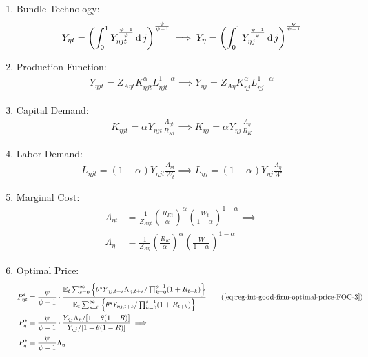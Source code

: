 \documentclass[../thesis.tex]{subfiles}
\begin{document}
\begin{enumerate}
	\item Bundle Technology:
	\begin{align}
		Y_{\eta t} = \left( \int_{0}^{1} Y_{\eta jt}^{\frac{\psi-1}{\psi}} \dif j \right)^{\frac{\psi}{\psi-1}} \implies %
		Y_{\eta} = \left( \int_{0}^{1} Y_{\eta j}^{\frac{\psi-1}{\psi}} \dif j \right)^{\frac{\psi}{\psi-1}} \label{eq:reg-ss-final-goods-firm-bundle-rule}
	\end{align}
	
	\item Production Function:
	\begin{align}
		Y_{\eta jt} = Z_{A\eta t} K_{\eta jt}^{\alpha_{}} L_{\eta jt}^{1-{\alpha_{}}} \implies Y_{\eta j} = Z_{A\eta} K_{\eta j}^{\alpha_{}} L_{\eta j}^{1-{\alpha_{}}} \label{eq:reg-ss-int-good-firm-production-function}
	\end{align}
	
	\item Capital Demand:
	\begin{align}
		K_{\eta jt} = {\alpha_{}} Y_{\eta jt} \frac{\Lambda_{\eta t}}{R_{Kt}} \implies K_{\eta j} = {\alpha_{}} Y_{\eta j} \frac{\Lambda_{\eta}}{R_K} \label{eq:reg-ss-int-good-firm-FOC-Kt}
	\end{align}
	
	\item Labor Demand:
	\begin{align}
		L_{\eta jt} = (1-{\alpha_{}}) Y_{\eta jt} \frac{\Lambda_{\eta t}}{W_t} \implies L_{\eta j} = (1 -{\alpha_{}}) Y_{\eta j} \frac{\Lambda_{\eta}}{W} \label{eq:reg-ss-int-good-firm-FOC-Lt}
	\end{align}
	
	\item Marginal Cost:
	\begin{align}
		\Lambda_{\eta t} &= \frac{1}{Z_{A\eta t}} \left( \frac{R_{Kt}}{{\alpha_{}}} \right)^{{\alpha_{}}} \left( \frac{W_t}{1-{\alpha_{}}} \right)^{1-{\alpha_{}}} \implies \nonumber \\
		\Lambda_{\eta} &= \frac{1}{Z_{A\eta}} \left( \frac{R_K}{{\alpha_{}}} \right)^{{\alpha_{}}} \left( \frac{W}{1-{\alpha_{}}} \right)^{1-{\alpha_{}}} \label{eq:reg-ss-int-good-firm-MC-2}
	\end{align}
	
	\item Optimal Price:
	\begin{alignat}{2}
		P_{\eta t}^{\ast} &= \frac{\psi}{\psi-1} \cdot \frac{\E \sum_{s=0}^{\infty} \left\{\theta^s Y_{\eta j,t+s} \Lambda_{\eta, t+s} / \prod_{k=0}^{s-1}(1+R_{t+k}) \right\}} {\E \sum_{s=0}^{\infty} \left\{ \theta^s Y_{\eta j,t+s} / \prod_{k=0}^{s-1}(1+R_{t+k}) \right\}} \tag{\ref{eq:reg-int-good-firm-optimal-price-FOC-3}} \\
		P_{\eta}^{\ast} &= \frac{\psi}{\psi-1} \cdot \frac{ Y_{\eta j} \Lambda_{\eta} / [1-\theta(1-R)]} {Y_{\eta j} / [1-\theta(1-R)]} \implies \nonumber \\
		P_{\eta}^{\ast} &= \frac{\psi}{\psi-1} \Lambda_{\eta} \label{eq:reg-ss-int-good-firm-optimal-price-FOC-3}
	\end{alignat}
	

\end{enumerate}
\end{document}
